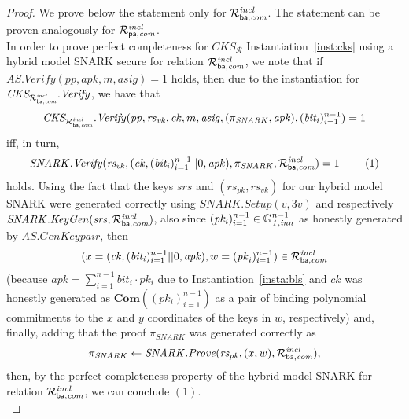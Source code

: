 \begin{proof} We prove below the statement only for $\mathcal{R}^{\mathit{incl}}_{\mathsf{ba},\mathit{com}}$. The statement can be proven analogously for $\mathcal{R}^{\mathit{incl}}_{\mathsf{pa},\mathit{com}}$. \\

In order to prove perfect completeness for $\mathit{CKS}_{\mathcal{R}}$ Instantiation~\ref{inst:cks} using a hybrid model SNARK secure for relation 
$\mathcal{R}^{\mathit{incl}}_{\mathsf{ba},\mathit{com}}$, we note that if $\mathit{AS.Verify}(\mathit{pp}, \mathit{apk}, m, \mathit{asig}) = 1$ holds, then due to the instantiation for \\
$\mathit{CKS_{\mathcal{R}^{\mathit{incl}}_{\mathsf{ba},\mathit{com}}}.Verify}$, we have that 
$$\mathit{CKS_{\mathcal{R}^{\mathit{incl}}_{\mathsf{ba},\mathit{com}}}.Verify}(\mathit{pp}, \mathit{rs}_{\mathit{vk}}, \mathit{ck}, m, \mathit{asig}, (\pi_{\mathit{SNARK}}, \mathit{apk}), (\mathit{bit_i})_{i=1}^{n-1}) =1$$ 
iff, in turn, 
$$\mathit{SNARK.Verify}(\mathit{rs_{vk}}, (\mathit{ck}, (\mathit{bit_i})_{i=1}^{n-1} || 0, \mathit{apk}), \pi_{\mathit{SNARK}}, \mathcal{R}^{\mathit{incl}}_{\mathsf{ba},\mathit{com}}) = 1 \ \ \ \ \ \ \ (1)$$ holds. 
Using the fact that the keys $\mathit{srs}$ and $(\mathit{rs}_{\mathit{pk}}, \mathit{rs}_{\mathit{vk}})$ for our hybrid model SNARK were generated correctly using 
$\mathit{SNARK.Setup}(v, 3v)$ and respectively $\mathit{SNARK.KeyGen}(\mathit{srs}, \mathcal{R}^{\mathit{incl}}_{\mathsf{ba},\mathit{com}})$, 
 also since $(\mathit{pk_i})_{i=1}^{n-1} \in \mathbb{G}_{\mathit{1,inn}}^{n-1}$ as honestly generated by $\mathit{AS.GenKeypair}$, then 
$$(x = (\mathit{ck}, (\mathit{bit_i})_{i=1}^{n-1}||0, \mathit{apk}), w = (\mathit{pk}_i)_{i=1}^{n-1}) \in \mathcal{R}^{\mathit{incl}}_{\mathsf{ba},\mathit{com}}$$ 
(because $\mathit{apk} = \sum_{i=1}^{n-1} \mathit{bit_i} \cdot \mathit{pk_i}$ due to Instantiation~\ref{insta:bls} and 
$\mathit{ck}$ was honestly generated as  $\mathbf{Com}((\mathit{pk_i})_{i=1}^{n-1})$ as a pair of binding polynomial commitments to the $x$ and $y$ 
coordinates of the keys in $w$, respectively) and, finally, adding that the proof 
$\pi_{\mathit{SNARK}}$ was generated correctly as 
$$ \pi_{\mathit{SNARK}} \leftarrow \mathit{SNARK.Prove}(\mathit{rs_{pk}}, (x,w), \mathcal{R}^{\mathit{incl}}_{\mathsf{ba},\mathit{com}}),$$ 
then, by the perfect completeness property of the hybrid model SNARK for relation $\mathcal{R}^{\mathit{incl}}_{\mathsf{ba},\mathit{com}}$, we can conclude $(1)$.\\


\end{proof}
